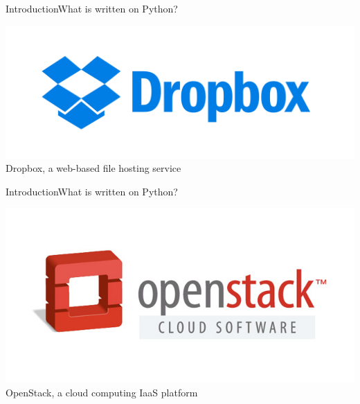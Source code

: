 \documentclass[10pt]{beamer}
\begin{document}
\begin{frame}{Introduction}{What is written on Python?}
	\begin{center}
		\includegraphics[width=1\textwidth]{pictures/dropbox.png}
		\large{\\Dropbox, a web-based file hosting service}
	\end{center}
\end{frame}

\begin{frame}{Introduction}{What is written on Python?}
	\begin{center}
		\includegraphics[width=1\textwidth]{pictures/open_stack.png}
		\large{\\OpenStack, a cloud computing IaaS platform}
	\end{center}
\end{frame}
\end{document}
